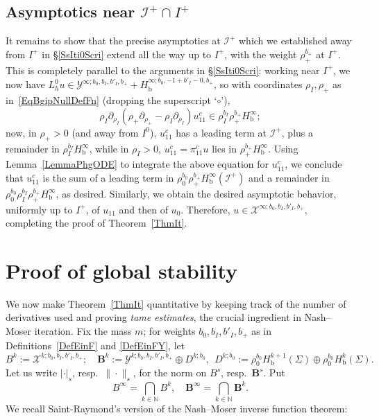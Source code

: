 \documentclass[reqno,11pt,letterpaper]{amsart}
\numberwithin{equation}{section}
\numberwithin{figure}{section}
\theoremstyle{definition}
\theoremstyle{remark}
\newcommand{\mc}{\mathcal}
\newcommand{\cX}{\mc X}
\newcommand{\cY}{\mc Y}
\newcommand{\ms}{\mathscr}
\newcommand{\scri}{\ms I}
\newcommand{\N}{\mathbb{N}}
\newcommand{\bfB}{\mathbf{B}}
\newcommand{\pa}{\partial}
\newcommand{\bop}{{\mathrm{b}}}
\newcommand{\Hb}{H_{\bop}}
\begin{document}
\subsection{Asymptotics near \texorpdfstring{$\scri^+\cap I^+$}{the future boundary of the radiation face}}
\label{SsItipScri}

It remains to show that the precise asymptotics at $\scri^+$ which we established away from $I^+$ in \S\ref{SsIti0Scri} extend all the way up to $I^+$, with the weight $\rho_+^{b_+}$ at $I^+$. This is completely parallel to the arguments in \S\ref{SsIti0Scri}: working near $I^+$, we now have $L^0_h u\in\cY^{\infty;b_0,b_I,b'_I,b_+}+\Hb^{\infty;b_0,-1+b'_I-0,b_+}$, so with coordinates $\rho_I,\rho_+$ as in~\eqref{EqBgipNullDefFn} (dropping the superscript `$\circ$'),
\[
  \rho_I\pa_{\rho_I}(\rho_+\pa_{\rho_+}-\rho_I\pa_{\rho_I})u_{1 1}^c\in\rho_I^{b_I}\rho_+^{b_+}\Hb^\infty;
\]
now, in $\rho_+>0$ (and away from $I^0$), $u_{1 1}^c$ has a leading term at $\scri^+$, plus a remainder in $\rho_I^{b_I}\Hb^\infty$, while in $\rho_I>0$, $u_{1 1}^c=\pi_{1 1}^c u$ lies in $\rho_+^{b_+}\Hb^\infty$. Using Lemma~\ref{LemmaPhgODE} to integrate the above equation for $u_{1 1}^c$, we conclude that $u_{1 1}^c$ is the sum of a leading term in $\rho_0^{b_0}\rho_+^{b_+}\Hb^\infty(\scri^+)$ and a remainder in $\rho_0^{b_0}\rho_I^{b_I}\rho_+^{b_+}\Hb^\infty$, as desired. Similarly, we obtain the desired asymptotic behavior, uniformly up to $I^+$, of $u_{1 1}$ and then of $u_0$. Therefore, $u\in\cX^{\infty;b_0,b_I,b'_I,b_+}$, completing the proof of Theorem~\ref{ThmIt}.



\section{Proof of global stability}
\label{SPf}

We now make Theorem~\ref{ThmIt} quantitative by keeping track of the number of derivatives used and proving \emph{tame estimates}, the crucial ingredient in Nash--Moser iteration. Fix the mass $m$; for weights $b_0,b_I,b'_I,b_+$ as in Definitions~\ref{DefEinF} and \ref{DefEinFY}, let
\[
  B^k := \cX^{k;b_0,b_I,b'_I,b_+}; \quad
  \bfB^k := \cY^{k;b_0,b_I,b'_I,b_+} \oplus D^{k;b_0},\ \ D^{k;b_0}:=\rho_0^{b_0}\Hb^{k+1}(\Sigma) \oplus \rho_0^{b_0}\Hb^k(\Sigma).
\]
Let us write $|\cdot|_s$, resp.\ $\|\cdot\|_s$, for the norm on $B^s$, resp.\ $\bfB^s$. Put
\[
  B^\infty = \bigcap_{k\in\N} B^k,\quad
  \bfB^\infty = \bigcap_{k\in\N} \bfB^k.
\]
We recall Saint-Raymond's version \cite{SaintRaymondNashMoser} of the Nash--Moser inverse function theorem:
\end{document}
